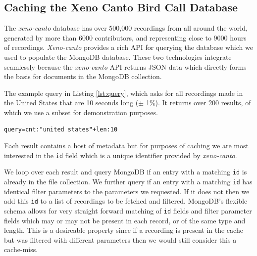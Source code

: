\documentclass[conference,twoside]{IEEEtran}
\newcommand{\code}[1]{\texttt{#1}}
\begin{document}

\subsection{Caching the Xeno Canto Bird Call Database}
The \textit{xeno-canto} database has over 500,000 recordings from all around the world, generated by more than 6000 contributors, and representing close to 9000 hours of recordings\cite{xenocanto}. \textit{Xeno-canto} provides a rich API for querying the database which we used to populate the MongoDB database. These two technologies integrate seamlessly because the \textit{xeno-canto} API returns JSON data which directly forms the basis for documents in the MongoDB collection.

The example query in Listing \ref{lst:query}, which asks for all recordings made in the United States that are 10 seconds long ($\pm$ 1\%). It returns over 200 results, of which we use a subset for demonstration purposes.
\begin{lstlisting}[language=Txt, caption={\textit{Xeno-canto} Query}, label={lst:query}]
query=cnt:"united states"+len:10
\end{lstlisting}

Each result contains a host of metadata but for purposes of caching we are most interested in the \code{id} field which is a unique identifier provided by \textit{xeno-canto}.

We loop over each result and query MongoDB if an entry with a matching \code{id} is already in the file collection. We further query if an entry with a matching \code{id} has identical filter parameters to the parameters we requested. If it does not then we add this \code{id} to a list of recordings to be fetched and filtered. MongoDB's flexible schema allows for very straight forward matching of \code{id} fields and filter parameter fields which may or may not be present in each record, or of the same type and length. This is a desireable property since if a recording is present in the cache but was filtered with different parameters then we would still consider this a cache-miss.
\end{document}
